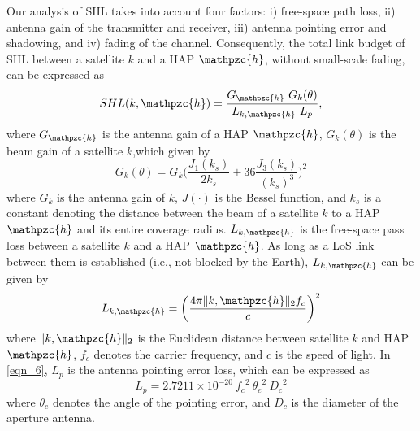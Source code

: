 \documentclass[letter,journal]{IEEEtran}
\newcommand{\blue}[1]{\textcolor{blue}{#1}}
\newcommand{\teal}[1]{\textcolor{teal}{#1}}
\begin{document}
Our analysis of SHL takes into account four factors: i) free-space path loss, ii) antenna gain of the transmitter and receiver, iii) antenna pointing error and shadowing, and iv) fading of the channel. Consequently, the total link budget of SHL between a satellite $k$ and a HAP $\mathpzc{h}$, without small-scale fading, can be expressed as \cite{gamal2022performance}%
\begin{equation} \label{eqn_6}
    SHL{(k,\mathpzc{h})} = \frac{G_{\mathpzc{h}}~G_{k}(\theta)}{{L}_{k,\mathpzc{h}}~L_p}, 
\end{equation}
where $G_{\mathpzc{h}}$ is the antenna gain of a HAP $\mathpzc{h}$, $G_{k}(\theta)$ is the beam gain of a satellite $k$,which given by \cite{yan2019ergodic}
\begin{equation}
    G_{k}(\theta)=G_{k} \Bigg(\frac{J_1(k_s)}{2k_s}+36\frac{J_3(k_s)}{(k_s)^3}\Bigg)^{2}
\end{equation}
where $G_k$ is the antenna gain of $k$, $J(\cdot)$ is the Bessel function, and $k_s$ is a constant denoting the distance between the beam of a satellite $k$ to a HAP $\mathpzc{h}$ and its entire coverage radius. ${L}_{k,\mathpzc{h}}$ is the free-space pass loss between a satellite $k$ and a HAP $\mathpzc{h}$. As long as a LoS link between them is established (i.e., not blocked by the Earth), ${L}_{k,\mathpzc{h}}$ can be given by \cite{happaper} 
\begin{equation}
    {L}_{k,\mathpzc{h}} = \bigg(\frac{4\pi \|k,\mathpzc{h}\|_{2}  f_c}{c}\bigg)^{2}
\end{equation}
where $\|k,\mathpzc{h}\|_{2}$ is the Euclidean distance between satellite  $k$ and HAP $\mathpzc{h}$, $f_c$ denotes the carrier frequency, and $c$ is the speed of light. In \eqref{eqn_6}, $L_p$ is the antenna pointing error loss, which can be expressed as \cite{gamal2022performance}
\begin{equation}
    L_p=2.7211\times 10^{-20}~{f_c}^2~{\theta_e}^2~{D_c}^2
\end{equation}
where ${\theta_e}$ denotes the angle of the pointing error, and ${D_c}$ is the diameter of the aperture antenna.
\end{document}
